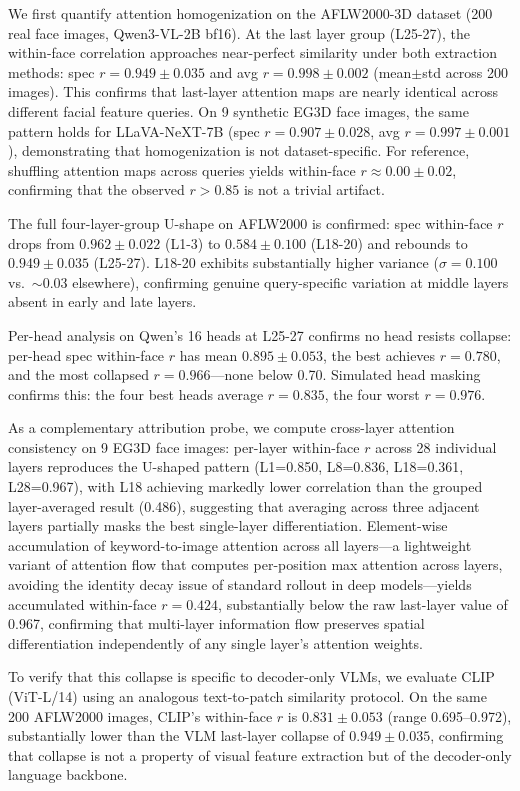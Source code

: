 \documentclass[10pt,twocolumn,letterpaper]{article}
\begin{document}
We first quantify attention homogenization on the AFLW2000-3D dataset (200 real face images, Qwen3-VL-2B bf16). At the last layer group (L25-27), the within-face correlation approaches near-perfect similarity under both extraction methods: spec $r=0.949\pm0.035$ and avg $r=0.998\pm0.002$ (mean$\pm$std across 200 images). This confirms that last-layer attention maps are nearly identical across different facial feature queries. On 9 synthetic EG3D face images, the same pattern holds for LLaVA-NeXT-7B (spec $r=0.907\pm0.028$, avg $r=0.997\pm0.001$), demonstrating that homogenization is not dataset-specific. For reference, shuffling attention maps across queries yields within-face $r\approx0.00\pm0.02$, confirming that the observed $r>0.85$ is not a trivial artifact.

The full four-layer-group U-shape on AFLW2000 is confirmed: spec within-face $r$ drops from $0.962\pm0.022$ (L1-3) to $0.584\pm0.100$ (L18-20) and rebounds to $0.949\pm0.035$ (L25-27). L18-20 exhibits substantially higher variance ($\sigma=0.100$ vs.\ $\sim0.03$ elsewhere), confirming genuine query-specific variation at middle layers absent in early and late layers.

Per-head analysis on Qwen's 16 heads at L25-27 confirms no head resists collapse: per-head spec within-face $r$ has mean $0.895\pm0.053$, the best achieves $r=0.780$, and the most collapsed $r=0.966$---none below 0.70. Simulated head masking confirms this: the four best heads average $r=0.835$, the four worst $r=0.976$.

As a complementary attribution probe, we compute cross-layer attention consistency on 9 EG3D face images: per-layer within-face $r$ across 28 individual layers reproduces the U-shaped pattern (L1=0.850, L8=0.836, L18=0.361, L28=0.967), with L18 achieving markedly lower correlation than the grouped layer-averaged result (0.486), suggesting that averaging across three adjacent layers partially masks the best single-layer differentiation. Element-wise accumulation of keyword-to-image attention across all layers---a lightweight variant of attention flow that computes per-position max attention across layers, avoiding the identity decay issue of standard rollout in deep models---yields accumulated within-face $r = 0.424$, substantially below the raw last-layer value of 0.967, confirming that multi-layer information flow preserves spatial differentiation independently of any single layer's attention weights.

To verify that this collapse is specific to decoder-only VLMs, we evaluate CLIP (ViT-L/14) using an analogous text-to-patch similarity protocol. On the same 200 AFLW2000 images, CLIP's within-face $r$ is $0.831\pm0.053$ (range 0.695--0.972), substantially lower than the VLM last-layer collapse of $0.949\pm0.035$, confirming that collapse is not a property of visual feature extraction but of the decoder-only language backbone.
\end{document}
